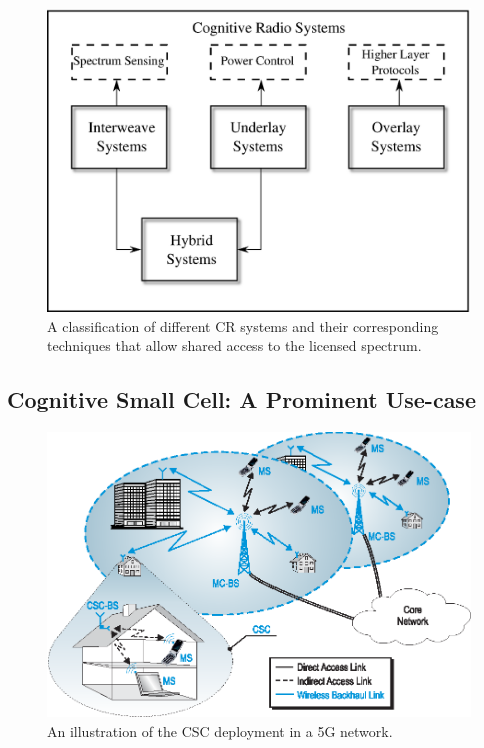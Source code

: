 \begin{figure}
\centering
\includegraphics[width = 0.85 \columnwidth]{figures/CR_paradigm}
\caption{A classification of different CR systems and their corresponding techniques that allow shared access to the licensed spectrum.}
\label{fig:paradigm}
\end{figure}



\subsection{Cognitive Small Cell: A Prominent Use-case}
\begin{figure}
\centering
\includegraphics[width = 0.9 \columnwidth]{figures/Cellular_Scenario_CR6F}
\caption{An illustration of the CSC deployment in a 5G network.}
\label{fig:archi}
\end{figure}



